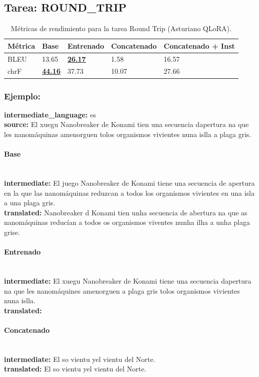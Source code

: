 \subsection{Tarea: ROUND\_TRIP}\label{tarea-round_trip}
\begin{longtable}[]{@{}lllll@{}}
\toprule\noalign{}
Métrica & Base & Entrenado & Concatenado & Concatenado + Inst \\
\midrule\noalign{}
\endhead
\bottomrule\noalign{}
\caption{Métricas de rendimiento para la tarea Round Trip (Asturiano QLoRA).}
\label{tab:metricas_round_trip_Asturiano QLoRA}
\endlastfoot
BLEU & 13.65 & \textbf{\underline{26.17}} & 1.58 & 16.57 \\
chrF & \textbf{\underline{44.16}} & 37.73 & 10.07 & 27.66 \\
\end{longtable}

\subsubsection{Ejemplo:}
\textbf{intermediate\_language:} es\\
\textbf{source:} El xuegu Nanobreaker de Konami tien una secuencia d\textquotesingle{}apertura na que les nanomáquinas amenorguen tolos organismos vivientes nuna islla a plaga gris.

\paragraph{Base}~\\
\textbf{intermediate:} El juego Nanobreaker de Konami tiene una secuencia de apertura en la que las nanomáquinas reduzcan a todos los organismos vivientes en una isla a una plaga gris.\\
\textbf{translated:} Nanobreaker d Konami tien unha secuencia de abertura na que as nanomáquinas reducían a todos os organismos viventes nunha ilha a unha plaga grise.

\paragraph{Entrenado}~\\
\textbf{intermediate:} El xuegu Nanobreaker de Konami tiene una secuencia d\textquotesingle{}apertura na que les nanomáquines amenorguen a plaga gris tolos organismos vivientes nuna islla.\\
\textbf{translated:} 

\paragraph{Concatenado}~\\
\textbf{intermediate:} El so vientu ye\textquotesingle{}l vientu del Norte.\\
\textbf{translated:} El so vientu ye\textquotesingle{}l vientu del Norte.


